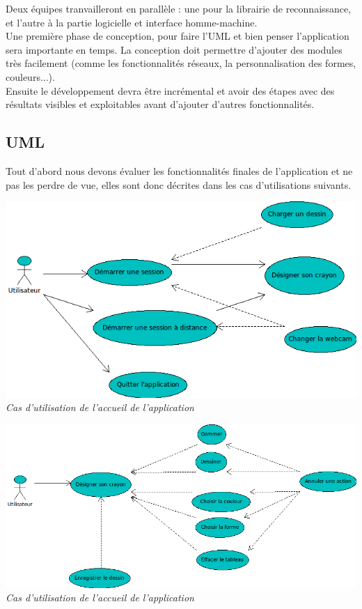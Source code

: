 \documentclass{article}
\begin{document}
		Deux équipes tranvailleront en parallèle  : une pour la librairie de reconnaissance, et l'autre à la partie logicielle et interface homme-machine. \\
		Une première phase de conception, pour faire l'UML et bien penser l'application sera importante en temps. 
		La conception doit permettre d'ajouter des modules très facilement (comme les fonctionnalités réseaux, la personnalisation des formes, couleurs...). \\
		Ensuite le développement devra être incrémental et avoir des étapes avec des résultats visibles et exploitables avant d'ajouter d'autres fonctionnalités. \\ 
		\subsection{UML}
		Tout d'abord nous devons évaluer les fonctionnalités finales de l'application et ne pas les perdre de vue, elles sont donc décrites dans les cas d'utilisations suivants. \\
			\begin{center}
			\includegraphics[scale=0.7]{../uml/Accueil.png} \\
			\it{Cas d'utilisation de l'accueil de l'application}
			\end{center}
			
			\begin{center}
			\includegraphics[scale=0.7]{../uml/Dessin.png} \\
			\it{Cas d'utilisation de l'accueil de l'application}
			\end{center}
\newpage
\end{document}
